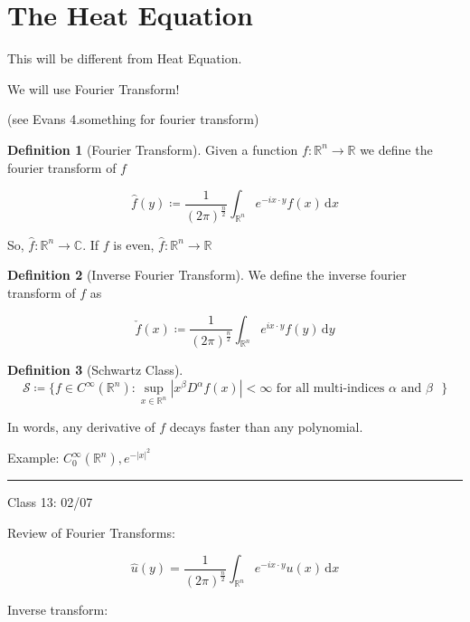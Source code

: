 \documentclass{article}
\theoremstyle{definition}
\newtheorem{definition}{Definition}
\begin{document}
\section*{The Heat Equation}

This will be different from Heat Equation.

We will use Fourier Transform!

(see Evans 4.something for fourier transform)

\begin{definition}[Fourier Transform]
    Given a function \(f:\mathbb{R} ^n \to \mathbb{R} \) we define the fourier transform of \(f\) 
    
    \[
        \hat{f} (y) \coloneqq \frac{1}{(2\pi)^{\frac{n}{2}}}\int_{\mathbb{R}^n}^{} e^{-ix\cdot y} f(x) \,\mathrm{d}x 
    \]
    
\end{definition}

So, \(\hat{f} :\mathbb{R}^n \to \mathbb{C}\). If \(f\) is even, \(\hat{f} :\mathbb{R}^n \to \mathbb{R}\) 

\begin{definition}[Inverse Fourier Transform]
    We define the inverse fourier transform of \(f\) as

    \[
        \check{f}(x)\coloneqq \frac{1}{(2\pi)^{\frac{n}{2}}} \int_{\mathbb{R}^n}^{} e^{ix\cdot y}f(y) \,\mathrm{d}y 
    \]

\end{definition}

\begin{definition}[Schwartz Class]
    \[
        \mathcal{S} \coloneqq \{ f\in C^{\infty}(\mathbb{R}^n): \sup_{x\in\mathbb{R}^n} \left\vert x^\beta D^\alpha f(x) \right\vert < \infty \text{ for all multi-indices \(\alpha \) and \(\beta\) } \} 
    \]    

    In words, any derivative of \(f\) decays faster than any polynomial.

    Example: \(C^\infty_0(\mathbb{R}^n),e^{-\vert x \vert ^2}\) 

\end{definition}

\hfil
\hrule

Class 13: 02/07

Review of Fourier Transforms:

\[
    \hat{u}(y) = \frac{1}{(2\pi )^\frac{n}{2}} \int_{\mathbb{R} ^n}^{} e^{-ix\cdot y} u(x) \,\mathrm{d}x 
\]

Inverse transform:
\end{document}
